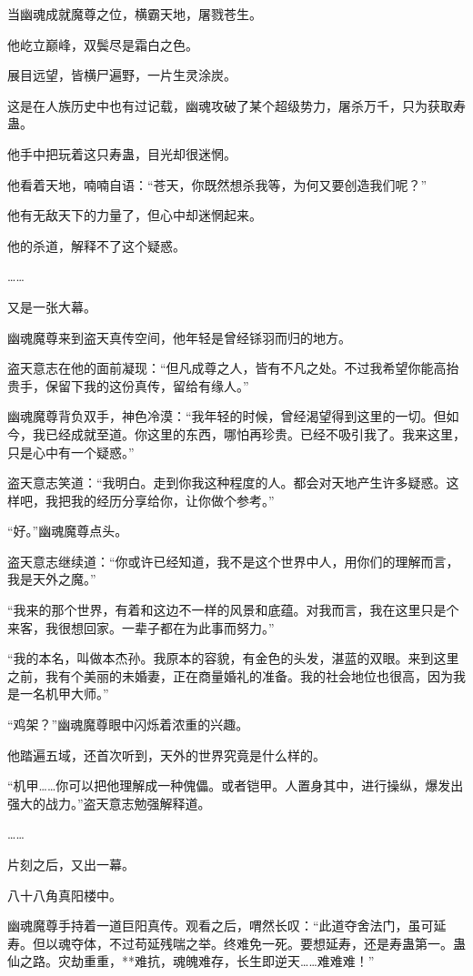 \begin{this_body}
当幽魂成就魔尊之位，横霸天地，屠戮苍生。

他屹立巅峰，双鬓尽是霜白之色。

展目远望，皆横尸遍野，一片生灵涂炭。

这是在人族历史中也有过记载，幽魂攻破了某个超级势力，屠杀万千，只为获取寿蛊。

他手中把玩着这只寿蛊，目光却很迷惘。

他看着天地，喃喃自语：“苍天，你既然想杀我等，为何又要创造我们呢？”

他有无敌天下的力量了，但心中却迷惘起来。

他的杀道，解释不了这个疑惑。

……

又是一张大幕。

幽魂魔尊来到盗天真传空间，他年轻是曾经铩羽而归的地方。

盗天意志在他的面前凝现：“但凡成尊之人，皆有不凡之处。不过我希望你能高抬贵手，保留下我的这份真传，留给有缘人。”

幽魂魔尊背负双手，神色冷漠：“我年轻的时候，曾经渴望得到这里的一切。但如今，我已经成就至道。你这里的东西，哪怕再珍贵。已经不吸引我了。我来这里，只是心中有一个疑惑。”

盗天意志笑道：“我明白。走到你我这种程度的人。都会对天地产生许多疑惑。这样吧，我把我的经历分享给你，让你做个参考。”

“好。”幽魂魔尊点头。

盗天意志继续道：“你或许已经知道，我不是这个世界中人，用你们的理解而言，我是天外之魔。”

“我来的那个世界，有着和这边不一样的风景和底蕴。对我而言，我在这里只是个来客，我很想回家。一辈子都在为此事而努力。”

“我的本名，叫做本杰孙。我原本的容貌，有金色的头发，湛蓝的双眼。来到这里之前，我有个美丽的未婚妻，正在商量婚礼的准备。我的社会地位也很高，因为我是一名机甲大师。”

“鸡架？”幽魂魔尊眼中闪烁着浓重的兴趣。

他踏遍五域，还首次听到，天外的世界究竟是什么样的。

“机甲……你可以把他理解成一种傀儡。或者铠甲。人置身其中，进行操纵，爆发出强大的战力。”盗天意志勉强解释道。

……

片刻之后，又出一幕。

八十八角真阳楼中。

幽魂魔尊手持着一道巨阳真传。观看之后，喟然长叹：“此道夺舍法门，虽可延寿。但以魂夺体，不过苟延残喘之举。终难免一死。要想延寿，还是寿蛊第一。蛊仙之路。灾劫重重，**难抗，魂魄难存，长生即逆天……难难难！”


\end{this_body}
